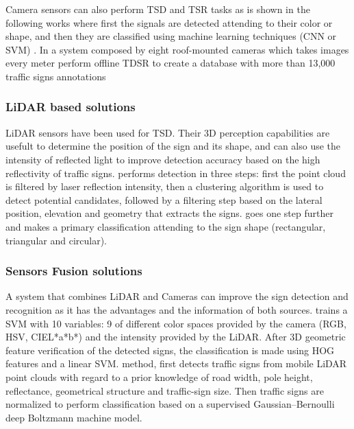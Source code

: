 Camera sensors can also perform TSD and TSR tasks as is 
shown in the following works where first the signals are detected attending to
their color or shape, and then they are classified using machine learning techniques (CNN or SVM)
\cite{miyata2017automatic, yang2016towards, wali2015automatic}. In \cite{timofte2014multi}
a system composed by eight roof-mounted cameras which takes images every meter
perform offline TDSR to create a database with more than 13,000 traffic signs annotations


\subsubsection{LiDAR based solutions}
LiDAR sensors have been used for TSD. Their 3D perception capabilities are 
usefult to determine the position of the sign and its shape, and can also use 
the intensity of reflected light to improve detection accuracy based on the
high reflectivity of traffic signs. \cite{gargoum2017automated} 
performs detection in three steps: first the point cloud is filtered by 
laser reflection intensity, then a clustering algorithm is used to detect 
potential candidates, followed by a filtering step based on the lateral 
position, elevation and geometry that extracts the signs. 
\cite{weng2016road} goes one step further and makes a primary 
classification attending to the sign shape (rectangular, triangular and 
circular).

\subsubsection{Sensors Fusion solutions}
A system that combines LiDAR and Cameras can improve the sign detection and 
recognition as it has the advantages and the information of both sources. 
\cite{zhou2014lidar} trains a SVM with 10 variables: 9 of different color 
spaces provided by the camera (RGB, HSV, CIEL*a*b*) and the intensity provided 
by the LiDAR. After 3D geometric feature verification of the detected signs, 
the classification is made using HOG features and a linear SVM. 
\cite{guan2018robust} method, first detects traffic signs from mobile LiDAR 
point clouds with regard to a prior knowledge of road width, pole height, 
reflectance, geometrical structure and traffic-sign size. Then traffic signs 
are normalized to perform classification based on a supervised 
Gaussian–Bernoulli deep Boltzmann machine model.


